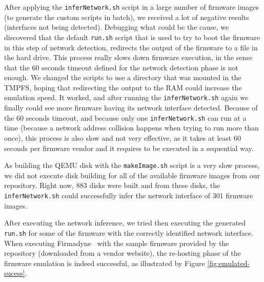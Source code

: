 After applying the {\tt inferNetwork.sh} script in a large number of firmware images (to generate the custom scripts in batch), we received a lot of negative results (interfaces not being detected). Debugging what could be the cause, we discovered that the default {\tt run.sh} script that is used to try to boot the firmware in this step of network detection, redirects the output of the firmware to a file in the hard drive. This process really slows down firmware execution, in the sense that the 60 seconds timeout defined for the network detection phase is not enough. We changed the scripts to use a directory that was mounted in the TMPFS, hoping that redirecting the output to the RAM could increase the emulation speed. It worked, and after running the {\tt inferNetwork.sh} again we finally could see more firmware having its network interface detected. Because of the 60 seconds timeout, and because only one {\tt inferNetwork.sh} can run at a time (because a network address collision happens when trying to run more than once), this process is also slow and not very effective, as it takes at least 60 seconds per firmware vendor and it requires to be executed in a sequential way.

As building the QEMU disk with the {\tt makeImage.sh} script is a very slow process, we did not execute disk building for all of the available firmware images from our repository. Right now, 883 disks were built and from these disks, the {\tt inferNetwork.sh} could successfully infer the network interface of 301 firmware images.

After executing the network inference, we tried then executing the generated {\tt run.sh} for some of the firmware with the correctly identified network interface. When executing Firmadyne~\cite{firmadyne} with the sample firmware provided by the repository (downloaded from a vendor website), the re-hosting phase of the firmware emulation is indeed successful, as illustrated by Figure \ref{fig:emulated-sucess}.

